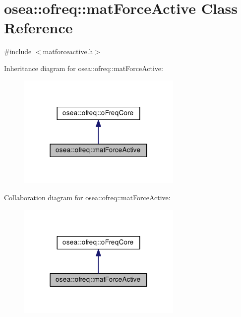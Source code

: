 \hypertarget{classosea_1_1ofreq_1_1mat_force_active}{\section{osea\-:\-:ofreq\-:\-:mat\-Force\-Active Class Reference}
\label{classosea_1_1ofreq_1_1mat_force_active}
}


{\ttfamily \#include $<$matforceactive.\-h$>$}



Inheritance diagram for osea\-:\-:ofreq\-:\-:mat\-Force\-Active\-:
\nopagebreak
\begin{figure}[H]
\begin{center}
\leavevmode
\includegraphics[width=226pt]{classosea_1_1ofreq_1_1mat_force_active__inherit__graph}
\end{center}
\end{figure}


Collaboration diagram for osea\-:\-:ofreq\-:\-:mat\-Force\-Active\-:
\nopagebreak
\begin{figure}[H]
\begin{center}
\leavevmode
\includegraphics[width=226pt]{classosea_1_1ofreq_1_1mat_force_active__coll__graph}
\end{center}
\end{figure}
